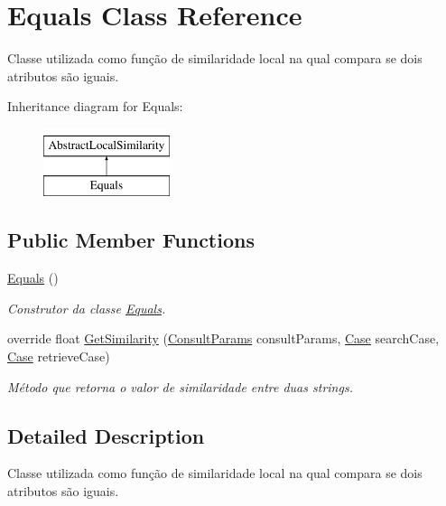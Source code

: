 \hypertarget{class_equals}{}\section{Equals Class Reference}
\label{class_equals}


Classe utilizada como função de similaridade local na qual compara se dois atributos são iguais.  


Inheritance diagram for Equals\+:\begin{figure}[H]
\begin{center}
\leavevmode
\includegraphics[height=2.000000cm]{class_equals}
\end{center}
\end{figure}
\subsection*{Public Member Functions}
\begin{DoxyCompactItemize}
\item 
\hyperlink{class_equals_a9ddef758a33b1c30e85a72b3c4db21fc}{Equals} ()
\begin{DoxyCompactList}\small\item\em Construtor da classe \hyperlink{class_equals}{Equals}. \end{DoxyCompactList}\item 
override float \hyperlink{class_equals_a1b7c994cee3bf4ff55f6eaef5f31c871}{Get\+Similarity} (\hyperlink{class_consult_params}{Consult\+Params} consult\+Params, \hyperlink{class_case}{Case} search\+Case, \hyperlink{class_case}{Case} retrieve\+Case)
\begin{DoxyCompactList}\small\item\em Método que retorna o valor de similaridade entre duas strings. \end{DoxyCompactList}\end{DoxyCompactItemize}


\subsection{Detailed Description}
Classe utilizada como função de similaridade local na qual compara se dois atributos são iguais. 



